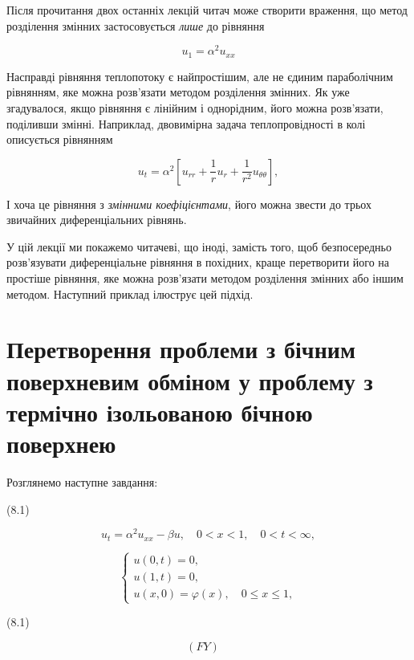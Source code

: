 \documentclass[
  ukrainian,
]{article}
\begin{document}
Після прочитання двох останніх лекцій читач може створити враження, що
метод розділення змінних застосовується \emph{лише} до рівняння

\[
u_1 = \alpha^2 u_{xx}
\]

Насправді рівняння теплопотоку є найпростішим, але не єдиним
параболічним рівнянням, яке можна розв'язати методом розділення змінних.
Як уже згадувалося, якщо рівняння є лінійним і однорідним, його можна
розв'язати, поділивши змінні. Наприклад, двовимірна задача
теплопровідності в колі описується рівнянням

\[
u_t = \alpha^2 \left[ u_{rr} + \frac{1}{r} u_r + \frac{1}{r^2} u_{\theta\theta} \right],
\]

І хоча це рівняння з \emph{змінними коефіцієнтами}, його можна звести до
трьох звичайних диференціальних рівнянь.

У цій лекції ми покажемо читачеві, що іноді, замість того, щоб
безпосередньо розв'язувати диференціальне рівняння в похідних, краще
перетворити його на простіше рівняння, яке можна розв'язати методом
розділення змінних або іншим методом. Наступний приклад ілюструє цей
підхід.

\section{Перетворення проблеми з бічним поверхневим обміном у проблему з
термічно ізольованою бічною
поверхнею}\label{ux43fux435ux440ux435ux442ux432ux43eux440ux435ux43dux43dux44f-ux43fux440ux43eux431ux43bux435ux43cux438-ux437-ux431ux456ux447ux43dux438ux43c-ux43fux43eux432ux435ux440ux445ux43dux435ux432ux438ux43c-ux43eux431ux43cux456ux43dux43eux43c-ux443-ux43fux440ux43eux431ux43bux435ux43cux443-ux437-ux442ux435ux440ux43cux456ux447ux43dux43e-ux456ux437ux43eux43bux44cux43eux432ux430ux43dux43eux44e-ux431ux456ux447ux43dux43eux44e-ux43fux43eux432ux435ux440ux445ux43dux435ux44e}

Розглянемо наступне завдання:

(8.1)

\[
u_{t} = \alpha^{2}u_{xx} - \beta u, \quad 0 < x < 1, \quad 0 < t < \infty,
\]

\[
\begin{cases} u(0, t) = 0, \\ u(1, t) = 0, \\ u(x, 0) = \varphi(x), \quad 0 \le x \le 1, \end{cases}
\]

(8.1)

\[
(FY) \quad
\]
\end{document}
